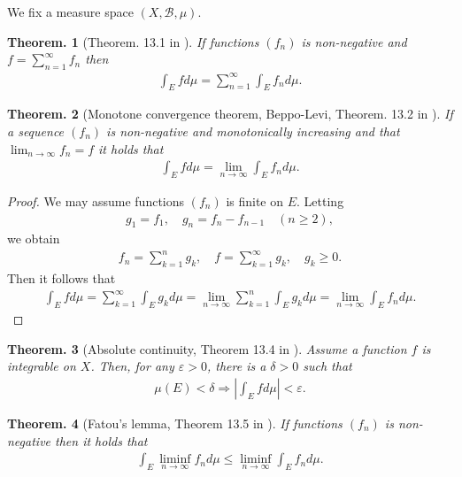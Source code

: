 \documentclass[openany, a4paper, oneside]{jsbook}
\theoremstyle{break}
\newtheorem{thm}{Theorem.}[section]
\theoremstyle{breakdefn}
\newcommand{\abs}[1]{\left|#1\right|}
\newcommand{\rbk}[1]{\left (#1\right)}
\newcommand{\calB}{\mathcal{B}}
\newcommand{\dmu}{d \mu}
\begin{document}
We fix a measure space $(X, \calB, \mu)$.
\begin{thm}[Theorem. 13.1 in \cite{SeizoIto1}]
 If functions $(f_n)$ is non-negative and $f = \sum_{n=1}^{\infty} f_n$ then
 \begin{align}
  \int_E f \dmu
  =
  \sum_{n=1}^{\infty} \int_E f_n \dmu.
 \end{align}
\end{thm}
\begin{thm}[Monotone convergence theorem, Beppo-Levi, Theorem. 13.2 in \cite{SeizoIto1}]
 If a sequence $(f_n)$ is non-negative and monotonically increasing and that $\lim_{n \to \infty} f_n = f$ it holds that
 \begin{align}
  \int_E f \dmu
  =
  \lim_{n \to \infty} \int_E f_n \dmu.
 \end{align}
\end{thm}
\begin{proof}
We may assume functions $(f_n)$ is finite on $E$.
Letting
\begin{align}
 g_1 = f_1, \quad
 g_n = f_n - f_{n-1} \quad (n \geq 2),
\end{align}
we obtain
\begin{align}
 f_n
 =
 \sum_{k=1}^n g_k, \quad
 f
 =
 \sum_{k=1}^{\infty} g_k, \quad
 g_k \geq 0.
\end{align}
Then it follows that
\begin{align}
 \int_E f \dmu
 =
 \sum_{k=1}^{\infty} \int_E g_k \dmu
 =
 \lim_{n \to \infty} \sum_{k=1}^n \int_E g_k \dmu
 =
 \lim_{n \to \infty} \int_E f_n \dmu.
\end{align}
\end{proof}
\begin{thm}[Absolute continuity, Theorem 13.4 in \cite{SeizoIto1}]
 Assume a function $f$ is integrable on $X$.
 Then, for any $\varepsilon > 0$, there is a $\delta > 0$ such that
 \begin{align}
  \mu \rbk{E} < \delta
  \Longrightarrow
  \abs{\int_E f \dmu} < \varepsilon.
 \end{align}
\end{thm}
\begin{thm}[Fatou's lemma, Theorem 13.5 in \cite{SeizoIto1}]
 If functions $(f_n)$ is non-negative then it holds that
 \begin{align}
  \int_E \liminf_{n \to \infty} f_n \dmu
  \leq
  \liminf_{n \to \infty} \int_E f_n \dmu.
 \end{align}
\end{thm}
\end{document}
